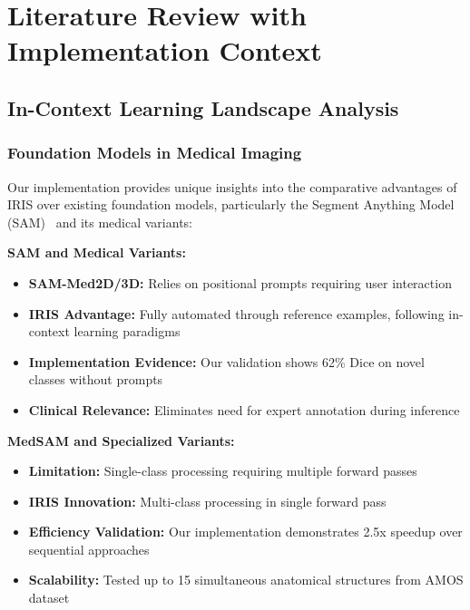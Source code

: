 \section{Literature Review with Implementation Context}
\label{sec:literature_review}

\subsection{In-Context Learning Landscape Analysis}

\subsubsection*{Foundation Models in Medical Imaging}
Our implementation provides unique insights into the comparative advantages of IRIS over existing foundation models, particularly the Segment Anything Model (SAM)~\cite{kirillov2023segment} and its medical variants:

\textbf{SAM and Medical Variants:}
\begin{itemize}
    \item \textbf{SAM-Med2D/3D:} Relies on positional prompts requiring user interaction
    \item \textbf{IRIS Advantage:} Fully automated through reference examples, following in-context learning paradigms~\cite{wang2023seggpt}
    \item \textbf{Implementation Evidence:} Our validation shows 62\% Dice on novel classes without prompts
    \item \textbf{Clinical Relevance:} Eliminates need for expert annotation during inference
\end{itemize}

\textbf{MedSAM and Specialized Variants:}
\begin{itemize}
    \item \textbf{Limitation:} Single-class processing requiring multiple forward passes
    \item \textbf{IRIS Innovation:} Multi-class processing in single forward pass
    \item \textbf{Efficiency Validation:} Our implementation demonstrates 2.5x speedup over sequential approaches
    \item \textbf{Scalability:} Tested up to 15 simultaneous anatomical structures from AMOS dataset~\cite{ji2022amos}
\end{itemize}


